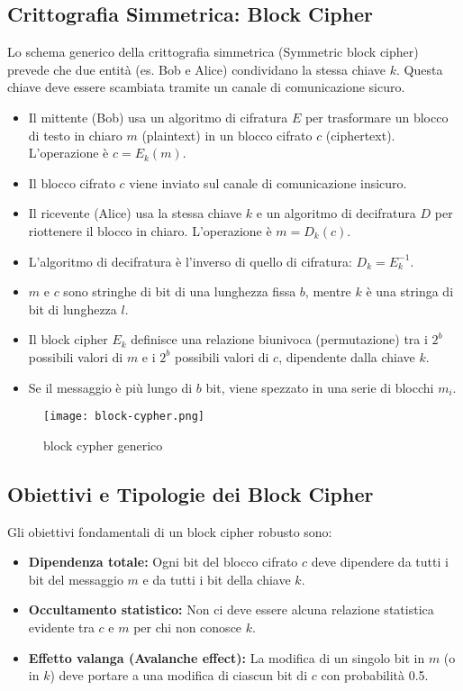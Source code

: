 \documentclass[../main.tex]{subfiles}
\begin{document}
\subsection{Crittografia Simmetrica: Block Cipher}
Lo schema generico della crittografia simmetrica (Symmetric block cipher) prevede che due entità (es. Bob e Alice) condividano la stessa chiave $k$. Questa chiave deve essere scambiata tramite un canale di comunicazione sicuro.

\begin{itemize}
    \item Il mittente (Bob) usa un algoritmo di cifratura $E$ per trasformare un blocco di testo in chiaro $m$ (plaintext) in un blocco cifrato $c$ (ciphertext). L'operazione è $c = E_k(m)$.
    \item Il blocco cifrato $c$ viene inviato sul canale di comunicazione insicuro.
    \item Il ricevente (Alice) usa la stessa chiave $k$ e un algoritmo di decifratura $D$ per riottenere il blocco in chiaro. L'operazione è $m = D_k(c)$.
    \item L'algoritmo di decifratura è l'inverso di quello di cifratura: $D_k = E_k^{-1}$.
    \item $m$ e $c$ sono stringhe di bit di una lunghezza fissa $b$, mentre $k$ è una stringa di bit di lunghezza $l$.
    \item Il block cipher $E_k$ definisce una relazione biunivoca (permutazione) tra i $2^b$ possibili valori di $m$ e i $2^b$ possibili valori di $c$, dipendente dalla chiave $k$.
    \item Se il messaggio è più lungo di $b$ bit, viene spezzato in una serie di blocchi $m_i$.
\end{itemize}

\begin{figure}[H]
  \centering
  \texttt{[image: block-cypher.png]}
  \caption{block cypher generico}
  \label{fig:etichetta}
\end{figure}


\subsection{Obiettivi e Tipologie dei Block Cipher}
Gli obiettivi fondamentali di un block cipher robusto sono:
\begin{itemize}
    \item \textbf{Dipendenza totale:} Ogni bit del blocco cifrato $c$ deve dipendere da tutti i bit del messaggio $m$ e da tutti i bit della chiave $k$.
    \item \textbf{Occultamento statistico:} Non ci deve essere alcuna relazione statistica evidente tra $c$ e $m$ per chi non conosce $k$.
    \item \textbf{Effetto valanga (Avalanche effect):} La modifica di un singolo bit in $m$ (o in $k$) deve portare a una modifica di ciascun bit di $c$ con probabilità 0.5.
\end{itemize}
\end{document}
